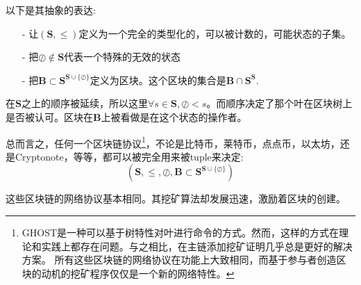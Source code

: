 \documentclass[letterpaper]{article}
\begin{document}
以下是其抽象的表达:

\begin{itemize}
\item[-] %
让$(\mathbf{S},\leq)$定义为一个完全的类型化的，可以被计数的，可能状态的子集。
\item[-]%
把$\oslash \notin \mathbf{S}$代表一个特殊的无效的状态
\item[-]%
把$\mathbf{B} \subset \mathbf{S}^{\mathbf{S} \cup \{\oslash\}}$定义为区块。这个区块的集合是$\mathbf{B} \cap \mathbf{S}^{\mathbf{S}}$.
\end{itemize}

在$\mathbf{S}$之上的顺序被延续，所以这里$\forall s \in \mathbf{S}, \oslash < s$。而顺序决定了那个叶在区块树上是否被认可。区块在$\mathbf{B}$上被看做是在这个状态的操作者。

总而言之，任何一个区块链协议\footnote{GHOST是一种可以基于树特性对叶进行命令的方式。然而，这样的方式在理论和实践上都存在问题。与之相比，在主链添加挖矿证明几乎总是更好的解决方案。
所有这些区块链的网络协议在功能上大致相同，而基于参与者创造区块的动机的挖矿程序仅仅是一个新的网络特性。
}，不论是比特币，莱特币，点点币，以太坊，还是Cryptonote，等等，都可以被完全用来被tuple来决定:
$$\left(\mathbf{S},\leq,\oslash,
\mathbf{B} \subset \mathbf{S}^{\mathbf{S} \cup \{\oslash\}}\right)$$

这些区块链的网络协议基本相同。其挖矿算法却发展迅速，激励着区块的创建。
\end{document}
